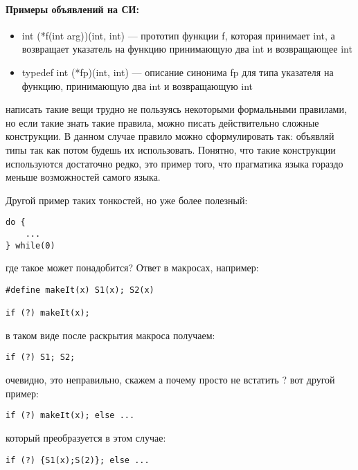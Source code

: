 \paragraph{Примеры объявлений на СИ:}

\begin{itemize}
\item int (*f(int arg))(int, int) --- прототип функции f, которая принимает int, а возвращает указатель на функцию принимающую два int и возвращающее int

\item typedef int (*fp)(int, int) --- описание синонима fp для типа указателя на функцию, принимающую два int и возвращающую int
\end{itemize}

написать такие вещи трудно не пользуясь некоторыми формальными правилами, но если такие знать такие правила, можно писать действительно сложные конструкции.
В данном случае правило можно сформулировать так: объявляй типы так как потом будешь их использовать. Понятно, что такие конструкции используются достаточно
редко, это пример того, что прагматика языка гораздо меньше возможностей самого языка.

Другой пример таких тонкостей, но уже более полезный:
\begin{lstlisting}
do {
	...
} while(0)
\end{lstlisting}

где такое может понадобится? Ответ в макросах, например:

\begin{lstlisting}
#define makeIt(x) S1(x); S2(x)

if (?) makeIt(x);
\end{lstlisting}

в таком виде после раскрытия макроса получаем:

\begin{lstlisting}
if (?) S1; S2;
\end{lstlisting}

очевидно, это неправильно, скажем а почему просто не встатить ${}$? вот другой пример:

\begin{lstlisting}
if (?) makeIt(x); else ...
\end{lstlisting}

который преобразуется в этом случае:

\begin{lstlisting}
if (?) {S1(x);S(2)}; else ...
\end{lstlisting}

